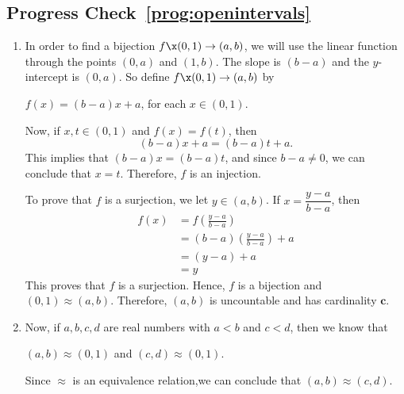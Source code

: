\subsection*{Progress Check~\ref{prog:openintervals}}
\begin{enumerate}
  \item \begin{myproof}
In order to find a bijection $f\x  ( 0, 1 ) \to ( a, b )$, we will use the linear function through the points $( 0, a )$ and $( 1, b )$.  The slope is 
$( b - a)$ and the $y$-intercept is $( 0, a )$. So define 
$f\x  ( 0, 1 ) \to ( a, b )$ by
\begin{center}
$f ( x ) = ( b - a )x + a$, for each $x \in ( 0, 1 )$.
\end{center}
Now, if $x, t \in ( 0, 1 )$ and $f ( x ) = f ( t )$, then 
\[
( b - a )x + a = ( b - a )t + a.
\]
This implies that $( b - a )x = ( b - a )t$, and since $b - a \ne 0$, we can conclude that $x = t$.  Therefore, $f$ is an injection.

To prove that $f$ is a surjection, we let $y \in ( a, b )$.  If 
$x = \dfrac{y - a}{b - a}$, then
\[
\begin{aligned}
f ( x ) &= f \!\left( \frac{y - a}{b - a} \right) \\
                   &= ( b - a ) \!\left( \frac{y - a}{b - a} \right) + a \\
                   &= ( y - a ) + a \\
                   &= y
\end{aligned}
\]
This proves that $f$ is a surjection.  Hence, $f$ is a bijection and 
$( 0, 1 ) \approx ( a, b )$.  Therefore, $( a, b )$ is uncountable and has cardinality $\boldsymbol{c}$.
\end{myproof}

\item Now, if $a, b, c, d$ are real numbers with $a < b$ and $c < d$, then we know that

\begin{center}
$( a, b ) \approx ( 0, 1 )$ and $( c, d ) \approx ( 0, 1 )$.
\end{center}

\noindent
Since $\approx$ is an equivalence relation,we can conclude that 
$( a, b ) \approx ( c, d )$.
\end{enumerate}
\hbreak

\endinput
